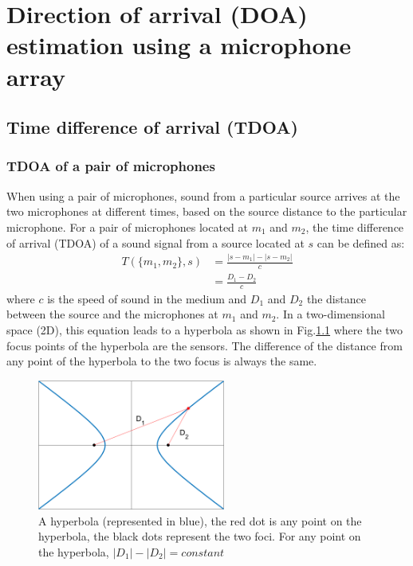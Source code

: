 \chapter{Direction of arrival (DOA) estimation using a microphone array}

\section{Time difference of arrival (TDOA)}\label{sec:TDOA}
\subsection{TDOA of a pair of microphones}
When using a pair of microphones, sound from a particular source arrives at the two microphones at different times, based on the source distance to the particular microphone. For a pair of microphones located at $m_{1}$ and $m_{2}$, the time difference of arrival (TDOA) of a sound signal from a source located at $s$ can be defined as:
\begin{equation}
    \begin{split}
    T(\{m_{1},m_{2}\},s)&=\frac{|s-m_{1}|-|s-m_{2}|}{c}\\
                        &=\frac{D_{1}-D_{2}}{c}
    \label{eq:tdoa}
    \end{split}
\end{equation}
where $c$ is the speed of sound in the medium and $D_{1}$ and $D_{2}$ the distance between the source and the microphones at $m_1$ and $m_2$. In a two-dimensional space (2D), this equation leads to a hyperbola as shown in Fig.\ref{eq:tdoa} where the two focus points of the hyperbola are the sensors. The difference of the distance from any point of the hyperbola to the two focus is always the same.
\begin{figure}[H]
    \centering
    \includegraphics[width=0.55\textwidth]{Figures/hyperbola.png}
    \caption{A hyperbola (represented in blue), the red dot is any point on the hyperbola, the black dots represent the two foci. For any point on the hyperbola, $|D_1|-|D_2| = constant$}
    \label{eq:tdoa}
\end{figure}
